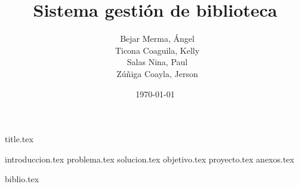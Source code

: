 \documentclass[a4paper,12pt]{article}
\title{Sistema gestión de biblioteca}
\author{\-\ Bejar Merma, Ángel\\
        \-\ Ticona Coaguila, Kelly\\
        \-\ Salas Nina, Paul\\
        \-\ Zúñiga Coayla, Jerson}
\date{\today}
\begin{document}
\renewcommand{\listtablename}{Lista de tablas}
\renewcommand{\tablename}{Tabla}
\renewcommand{\listfigurename}{Lista de figuras}
\renewcommand{\figurename}{Figura}

{title.tex}

\tableofcontents
\pagebreak
\listoffigures
\pagebreak

{introduccion.tex}
{problema.tex}
{solucion.tex}
{objetivo.tex}
{proyecto.tex}
{anexos.tex}

{biblio.tex}
\end{document}
